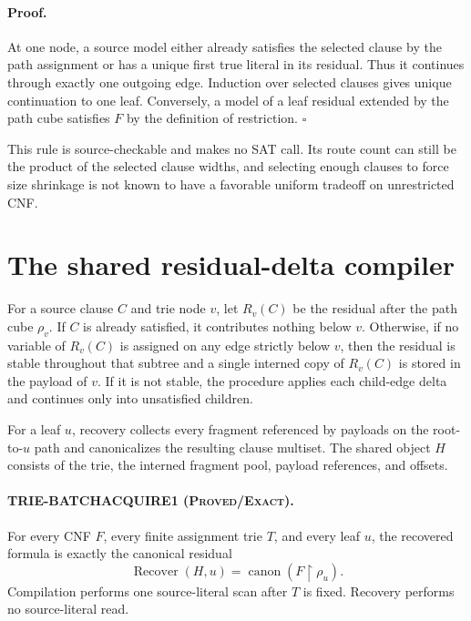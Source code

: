\documentclass[11pt]{article}
\newcommand{\Exact}{\textnormal{\textsc{Proved/Exact}}}
\newcommand{\res}{\mathbin{\upharpoonright}}
\begin{document}
\paragraph{Proof.}
At one node, a source model either already satisfies the selected clause by
the path assignment or has a unique first true literal in its residual.
Thus it continues through exactly one outgoing edge.  Induction over selected
clauses gives unique continuation to one leaf.  Conversely, a model of a leaf
residual extended by the path cube satisfies $F$ by the definition of
restriction.  \hfill$\square$

This rule is source-checkable and makes no SAT call.  Its route count can
still be the product of the selected clause widths, and selecting enough
clauses to force size shrinkage is not known to have a favorable uniform
tradeoff on unrestricted CNF.

\section{The shared residual-delta compiler}

For a source clause $C$ and trie node $v$, let $R_v(C)$ be the residual after
the path cube $\rho_v$.  If $C$ is already satisfied, it contributes nothing
below $v$.  Otherwise, if no variable of $R_v(C)$ is assigned on any edge
strictly below $v$, then the residual is stable throughout that subtree and a
single interned copy of $R_v(C)$ is stored in the payload of $v$.  If it is
not stable, the procedure applies each child-edge delta and continues only
into unsatisfied children.

For a leaf $u$, recovery collects every fragment referenced by payloads on
the root-to-$u$ path and canonicalizes the resulting clause multiset.  The
shared object $H$ consists of the trie, the interned fragment pool, payload
references, and offsets.

\paragraph{TRIE-BATCHACQUIRE1 (\Exact).}
For every CNF $F$, every finite assignment trie $T$, and every leaf $u$,
the recovered formula is exactly the canonical residual
\[
                  \operatorname{Recover}(H,u)
                  =\operatorname{canon}(F\res\rho_u).
\]
Compilation performs one source-literal scan after $T$ is fixed.  Recovery
performs no source-literal read.
\end{document}
